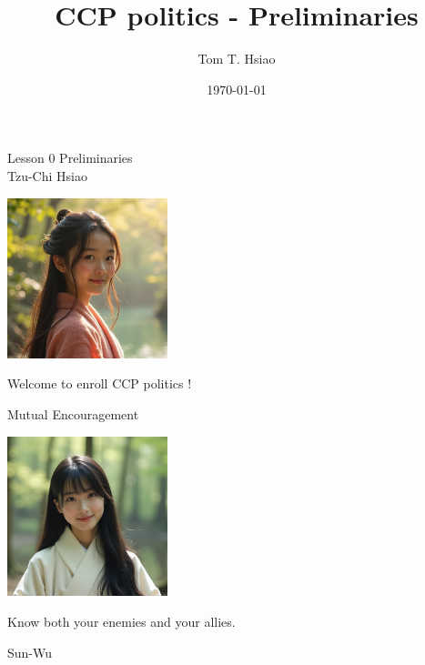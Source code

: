 \documentclass{beamer}
\title{CCP politics - Preliminaries}
\author{Tom T. Hsiao}
\date{\today}
\begin{document}
\begin{frame}
\begin{center}
\Large{Lesson 0 Preliminaries} \\
\vspace{3em}
\normalsize{Tzu-Chi Hsiao} \\
\end{center}
\end{frame}
\begin{frame}{}
\begin{center}
\includegraphics[width=0.35\textwidth]{instructor.png}
\end{center}
\vspace{1em}
\begin{center}
\large{Welcome to enroll CCP politics !} \\
\end{center}
\end{frame}
\begin{frame}{Mutual Encouragement}
\begin{center}
\includegraphics[width=0.35\textwidth]{mc.png}
\end{center}
\begin{center}
Know both your enemies and your allies.
\end{center}
\flushright Sun-Wu
\end{frame}
\end{document}
